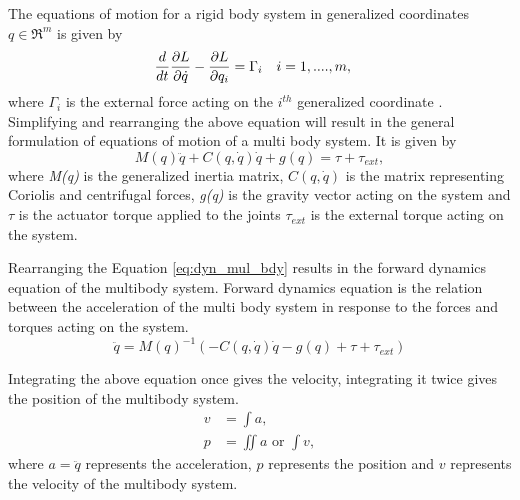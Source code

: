 The equations of motion for a rigid body system in generalized coordinates $q \in \Re^m $ is given by
\begin{align}
\label{eq:lagrange}
\frac{d}{dt} &\frac{\partial {L}}{\partial {\dot{q}}} - \frac{\partial {L}}{\partial {q_i}} = \Gamma_i && i=1,....,m,
\end{align}
where $\Gamma_i$ is the external force acting on the $i^{th}$ generalized coordinate \cite[Chapter 4]{mur94}.
Simplifying and rearranging the above equation will result in the general formulation of equations of motion of a multi body system. It is given by
\begin{equation}
\label{eq:dyn_mul_bdy}
M(q)\ddot{q}+C(q,\dot{q})\dot{q}+g(q) = \tau + \tau_{ext},
\end{equation}
where \emph{M(q)} is the generalized inertia matrix, $C(q,\dot{q})$ is the matrix representing Coriolis and centrifugal forces, \emph{g(q)} is the gravity vector acting on the system and $\tau$ is the actuator torque applied to the joints $\tau_{ext}$ is the external torque acting on the system.

Rearranging the Equation \ref{eq:dyn_mul_bdy} results in the forward dynamics equation of the multibody system. Forward dynamics equation is the relation between the acceleration of the multi body system in response to the forces and torques acting on the system.
\begin{equation}
    \label{eq:fwdyn}
    \ddot{q} = M(q)^{-1} (- C(q,\dot{q})\dot{q} -g(q) + \tau + \tau_{ext})
\end{equation}

Integrating the above equation once gives the velocity, integrating it twice gives the position of the multibody system. 
$$ \begin{aligned} 
    v &= \int a ,\\ 
    p &=  \iint a \text{ or } \int v , 
    \end{aligned}$$ where $a = \ddot{q}$ represents the acceleration, $p$ represents the position and $v$ represents the velocity of the multibody system.

